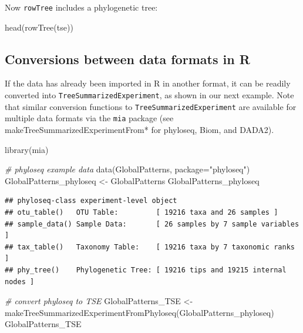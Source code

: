 \documentclass[
]{book}
\newenvironment{Shaded}{\begin{snugshade}}{\end{snugshade}}
\newcommand{\AttributeTok}[1]{\textcolor[rgb]{0.77,0.63,0.00}{#1}}
\newcommand{\CommentTok}[1]{\textcolor[rgb]{0.56,0.35,0.01}{\textit{#1}}}
\newcommand{\FunctionTok}[1]{\textcolor[rgb]{0.00,0.00,0.00}{#1}}
\newcommand{\NormalTok}[1]{#1}
\newcommand{\OtherTok}[1]{\textcolor[rgb]{0.56,0.35,0.01}{#1}}
\newcommand{\StringTok}[1]{\textcolor[rgb]{0.31,0.60,0.02}{#1}}
\begin{document}
Now \texttt{rowTree} includes a phylogenetic tree:

\begin{Shaded}
\begin{Highlighting}[]
\FunctionTok{head}\NormalTok{(}\FunctionTok{rowTree}\NormalTok{(tse))}
\end{Highlighting}
\end{Shaded}

\hypertarget{conversions-between-data-formats-in-r}{%
\subsection{Conversions between data formats in R}\label{conversions-between-data-formats-in-r}}

If the data has already been imported in R in another format, it
can be readily converted into \texttt{TreeSummarizedExperiment}, as shown in our next
example. Note that similar conversion functions to
\texttt{TreeSummarizedExperiment} are available for multiple data formats via
the \texttt{mia} package (see makeTreeSummarizedExperimentFrom* for phyloseq,
Biom, and DADA2).

\begin{Shaded}
\begin{Highlighting}[]
\FunctionTok{library}\NormalTok{(mia)}

\CommentTok{\# phyloseq example data}
\FunctionTok{data}\NormalTok{(GlobalPatterns, }\AttributeTok{package=}\StringTok{"phyloseq"}\NormalTok{) }
\NormalTok{GlobalPatterns\_phyloseq }\OtherTok{\textless{}{-}}\NormalTok{ GlobalPatterns}
\NormalTok{GlobalPatterns\_phyloseq}
\end{Highlighting}
\end{Shaded}

\begin{verbatim}
## phyloseq-class experiment-level object
## otu_table()   OTU Table:         [ 19216 taxa and 26 samples ]
## sample_data() Sample Data:       [ 26 samples by 7 sample variables ]
## tax_table()   Taxonomy Table:    [ 19216 taxa by 7 taxonomic ranks ]
## phy_tree()    Phylogenetic Tree: [ 19216 tips and 19215 internal nodes ]
\end{verbatim}

\begin{Shaded}
\begin{Highlighting}[]
\CommentTok{\# convert phyloseq to TSE}
\NormalTok{GlobalPatterns\_TSE }\OtherTok{\textless{}{-}} \FunctionTok{makeTreeSummarizedExperimentFromPhyloseq}\NormalTok{(GlobalPatterns\_phyloseq) }
\NormalTok{GlobalPatterns\_TSE}
\end{Highlighting}
\end{Shaded}
\end{document}
